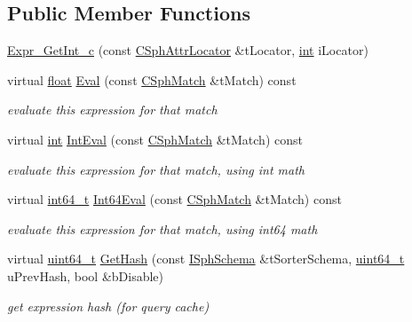 \subsection*{Public Member Functions}
\begin{DoxyCompactItemize}
\item 
\hyperlink{structExpr__GetInt__c_a3de7160ad0560f4bae13febdf8d77495}{Expr\-\_\-\-Get\-Int\-\_\-c} (const \hyperlink{structCSphAttrLocator}{C\-Sph\-Attr\-Locator} \&t\-Locator, \hyperlink{sphinxexpr_8cpp_a4a26e8f9cb8b736e0c4cbf4d16de985e}{int} i\-Locator)
\item 
virtual \hyperlink{sphinxexpr_8cpp_a0e0d0739f7035f18f949c2db2c6759ec}{float} \hyperlink{structExpr__GetInt__c_aaa310693db18357f6aeb4b32fc0900a2}{Eval} (const \hyperlink{classCSphMatch}{C\-Sph\-Match} \&t\-Match) const 
\begin{DoxyCompactList}\small\item\em evaluate this expression for that match \end{DoxyCompactList}\item 
virtual \hyperlink{sphinxexpr_8cpp_a4a26e8f9cb8b736e0c4cbf4d16de985e}{int} \hyperlink{structExpr__GetInt__c_acb2e53059b7e8eafd2a41f1724e9c659}{Int\-Eval} (const \hyperlink{classCSphMatch}{C\-Sph\-Match} \&t\-Match) const 
\begin{DoxyCompactList}\small\item\em evaluate this expression for that match, using int math \end{DoxyCompactList}\item 
virtual \hyperlink{sphinxstd_8h_a996e72f71b11a5bb8b3b7b6936b1516d}{int64\-\_\-t} \hyperlink{structExpr__GetInt__c_af40571a41dd7361b12e5a5b8da53ae99}{Int64\-Eval} (const \hyperlink{classCSphMatch}{C\-Sph\-Match} \&t\-Match) const 
\begin{DoxyCompactList}\small\item\em evaluate this expression for that match, using int64 math \end{DoxyCompactList}\item 
virtual \hyperlink{sphinxstd_8h_aaa5d1cd013383c889537491c3cfd9aad}{uint64\-\_\-t} \hyperlink{structExpr__GetInt__c_ad3ac54cc9e785ded035a612d5ff7698a}{Get\-Hash} (const \hyperlink{classISphSchema}{I\-Sph\-Schema} \&t\-Sorter\-Schema, \hyperlink{sphinxstd_8h_aaa5d1cd013383c889537491c3cfd9aad}{uint64\-\_\-t} u\-Prev\-Hash, bool \&b\-Disable)
\begin{DoxyCompactList}\small\item\em get expression hash (for query cache) \end{DoxyCompactList}\end{DoxyCompactItemize}
